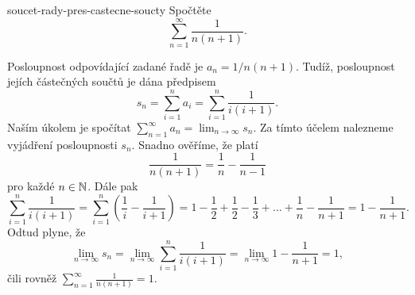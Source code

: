 \begin{problem}{}{soucet-rady-pres-castecne-soucty}
 Spočtěte
 \[
  \sum_{n=1}^{\infty} \frac{1}{n(n+1)}.
 \]
\end{problem}
\begin{probsol}
 Posloupnost odpovídající zadané řadě je $a_n = 1 / n(n+1)$. Tudíž, posloupnost
 jejích částečných součtů je dána předpisem
 \[
  s_n = \sum_{i=1}^{n} a_i = \sum_{i=1}^n \frac{1}{i(i+1)}.
 \]
 Naším úkolem je spočítat $\sum_{n=1}^{\infty} a_n = \lim_{n \to \infty} s_n$.
 Za tímto účelem nalezneme  vyjádření posloupnosti $s_n$. Snadno
 ověříme, že platí
 \[
  \frac{1}{n(n+1)} = \frac{1}{n} - \frac{1}{n-1}
 \]
 pro každé $n \in \mathbb{N}$. Dále pak
 \[
  \sum_{i = 1}^{n} \frac{1}{i(i+1)} = \sum_{i=1}^n \left( \frac{1}{i} -
  \frac{1}{i+1} \right) = 1 - \frac{1}{2} + \frac{1}{2} - \frac{1}{3} + \ldots +
  \frac{1}{n} - \frac{1}{n + 1} = 1 - \frac{1}{n+1}.
 \]
 Odtud plyne, že
 \[
  \lim_{n \to \infty} s_n = \lim_{n \to \infty} \sum_{i = 1}^{n}
  \frac{1}{i(i+1)} = \lim_{n \to \infty} 1 - \frac{1}{n+1} = 1,
 \]
 čili rovněž $\sum_{n=1}^{\infty} \frac{1}{n(n+1)} = 1$.
\end{probsol}


